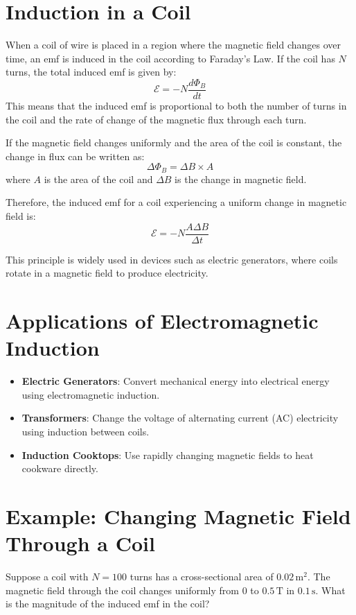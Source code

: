 \section{Induction in a Coil}
When a coil of wire is placed in a region where the magnetic field changes over time, an emf is induced in the coil according to Faraday's Law. If the coil has $N$ turns, the total induced emf is given by:
\[
\mathcal{E} = -N \frac{d\Phi_B}{dt}
\]  
This means that the induced emf is proportional to both the number of turns in the coil and the rate of change of the magnetic flux through each turn.

If the magnetic field changes uniformly and the area of the coil is constant, the change in flux can be written as:
\[
\Delta \Phi_B = \Delta B \times A
\]
where $A$ is the area of the coil and $\Delta B$ is the change in magnetic field.

Therefore, the induced emf for a coil experiencing a uniform change in magnetic field is:
\[  
\mathcal{E} = -N \frac{A \Delta B }{\Delta t}
\]

This principle is widely used in devices such as electric generators, where coils rotate in a magnetic field to produce electricity.

\section{Applications of Electromagnetic Induction}
\begin{itemize}
    \item \textbf{Electric Generators}: Convert mechanical energy into electrical energy using electromagnetic induction.
    \item \textbf{Transformers}: Change the voltage of alternating current (AC) electricity using induction between coils.
    \item \textbf{Induction Cooktops}: Use rapidly changing magnetic fields to heat cookware directly.
\end{itemize}

\section{Example: Changing Magnetic Field Through a Coil}
Suppose a coil with $N = 100$ turns has a cross-sectional area of $0.02\,\mathrm{m}^2$. The magnetic field through the coil changes uniformly from $0$ to $0.5\,\mathrm{T}$ in $0.1\,\mathrm{s}$. What is the magnitude of the induced emf in the coil?

